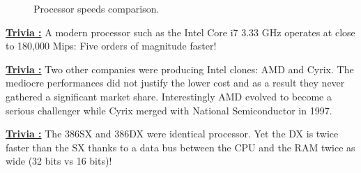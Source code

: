 \documentclass[book.tex]{subfiles}
\begin{document}
\begin{figure}[H]
\centering
   \caption{Processor speeds comparison.} \label{fig:mips}
 \end{figure}

 \textbf{\underline{Trivia :}} A modern processor such as the Intel Core i7 3.33 GHz operates at close to 180,000 Mips: Five orders of magnitude faster!

 \bigskip

\textbf{\underline{Trivia :}}  Two other companies were producing Intel clones: AMD and Cyrix. The mediocre performances did not justify the lower cost and as a result they never gathered a significant market share. Interestingly AMD evolved to become a serious challenger while Cyrix merged with National Semiconductor in 1997.

 \bigskip
 
 \textbf{\underline{Trivia :}} The 386SX and 386DX were identical processor. Yet the DX is twice faster than the SX thanks to a data bus between the CPU and the RAM twice as wide (32 bits vs 16 bits)!
\end{document}
